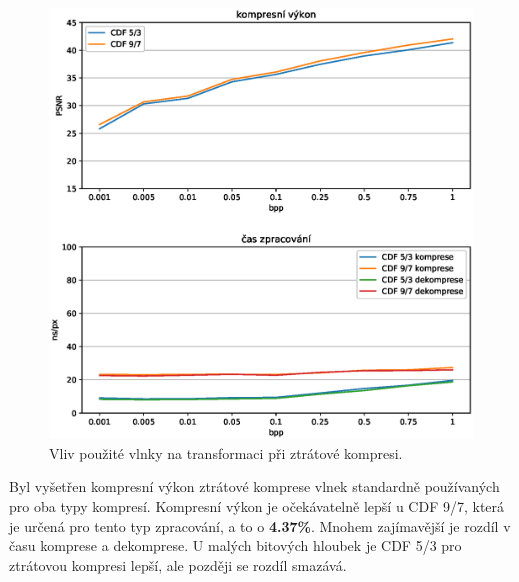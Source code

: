 \begin{figure}[hbt!]
  \centering
  \hspace*{-0.75cm}
  \includegraphics[width=16cm]{obrazky-figures/waves/fotky_waves.eps}
  \caption{Vliv použité vlnky na transformaci při ztrátové kompresi.}
\end{figure}
\noindent Byl vyšetřen kompresní výkon ztrátové komprese vlnek standardně používaných pro oba typy kompresí. Kompresní výkon je očekávatelně lepší u CDF 9/7, která je určená pro tento typ zpracování, a to o \textbf{4.37\%}. Mnohem zajímavější je rozdíl v času komprese a dekomprese. U malých bitových hloubek je CDF 5/3 pro ztrátovou kompresi lepší, ale později se rozdíl smazává.



